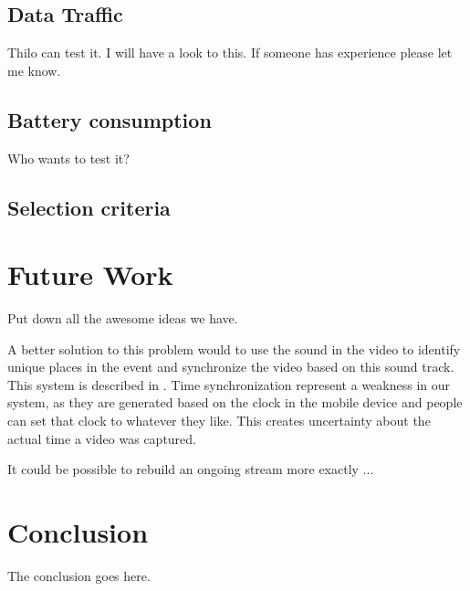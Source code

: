 \documentclass[conference]{IEEEtran}
\begin{document}
\subsection{Data Traffic} 
Thilo can test it. I will have a look to this. If someone has experience please let me know.

\subsection{Battery consumption}
Who wants to test it?

\subsection{Selection criteria}

\section{Future Work}
Put down all the awesome ideas we have.

A better solution to this problem would to use the sound in the video to identify unique places in the event and
synchronize the video based on this sound track. This system is described in \cite{shrestha_automatic_2010}. 
Time synchronization represent a weakness in our system, as they are generated based on the clock in the mobile device
and people can set that clock to whatever they like. This creates uncertainty about the actual time a video was captured.

It could be possible to rebuild an ongoing stream more exactly ...


\section{Conclusion}
The conclusion goes here.



\end{document}
